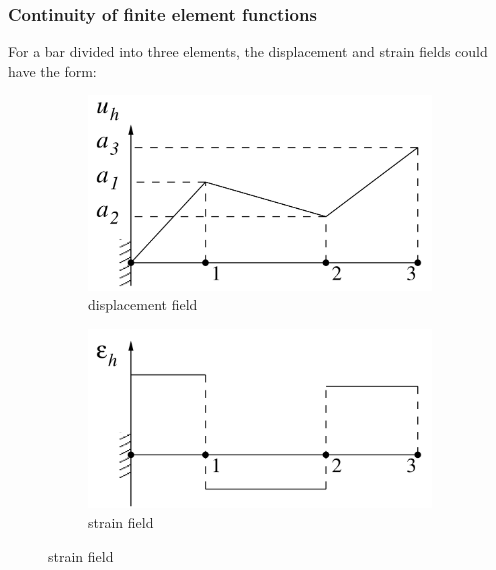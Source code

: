\documentclass[notes]{beamer}
\begin{document}
\begin{frame}
\frametitle{Continuity of finite element functions}
For a bar divided into three elements, the displacement and strain fields could have the
form:
\begin{figure}[ht]
	\centering
	\begin{subfigure}[b]{0.5\linewidth}
		\centering
		\includegraphics[width=\textwidth]{figs/beam-disp.png}
		\caption{displacement field}
	\end{subfigure}%
	\begin{subfigure}[b]{0.5\linewidth}
		\centering
		\includegraphics[width=\textwidth]{figs/beam-strains.png}
		\caption{strain field}
	\end{subfigure}
\end{figure}
\end{frame}
\end{document}
